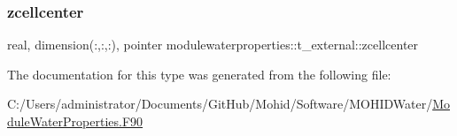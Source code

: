 \subsubsection{\texorpdfstring{zcellcenter}{zcellcenter}}
{\footnotesize\ttfamily real, dimension(\+:,\+:,\+:), pointer modulewaterproperties\+::t\+\_\+external\+::zcellcenter\hspace{0.3cm}{\ttfamily [private]}}



The documentation for this type was generated from the following file\+:\begin{DoxyCompactItemize}
\item 
C\+:/\+Users/administrator/\+Documents/\+Git\+Hub/\+Mohid/\+Software/\+M\+O\+H\+I\+D\+Water/\mbox{\hyperlink{_module_water_properties_8_f90}{Module\+Water\+Properties.\+F90}}\end{DoxyCompactItemize}
